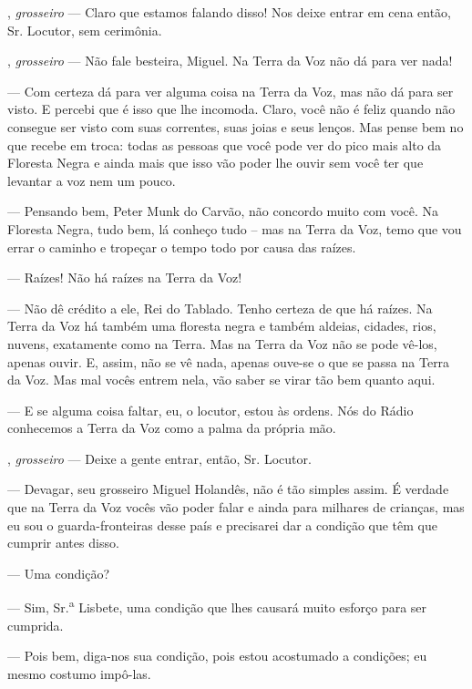 \begin{myparindent}{0pt}
\begin{Parskip}
, \emph{grosseiro} --- Claro que estamos falando disso!
Nos deixe entrar em cena então, Sr. Locutor, sem cerimônia.

, \emph{grosseiro} --- Não fale besteira, Miguel. Na Terra da Voz
não dá para ver nada!

 --- Com certeza dá para ver alguma coisa na Terra da
Voz, mas não dá para ser visto. E percebi que é isso que lhe incomoda.
Claro, você não é feliz quando não consegue ser visto com suas
correntes, suas joias e seus lenços. Mas pense bem no que recebe em
troca: todas as pessoas que você pode ver do pico mais alto da Floresta
Negra e ainda mais que isso vão poder lhe ouvir sem você ter que
levantar a voz nem um pouco.

 --- Pensando bem, Peter Munk do Carvão, não concordo muito
com você. Na Floresta Negra, tudo bem, lá conheço tudo -- mas na Terra
da Voz, temo que vou errar o caminho e tropeçar o tempo todo por causa
das raízes.

 --- Raízes! Não há raízes na Terra da Voz!

 --- Não dê crédito a ele, Rei do Tablado. Tenho
certeza de que há raízes. Na Terra da Voz há também uma floresta negra e
também aldeias, cidades, rios, nuvens, exatamente como na Terra. Mas na
Terra da Voz não se pode vê-los, apenas ouvir. E, assim, não se vê nada,
apenas ouve-se o que se passa na Terra da Voz. Mas mal vocês entrem
nela, vão saber se virar tão bem quanto aqui.

 --- E se alguma coisa faltar, eu, o locutor, estou às ordens. Nós
do Rádio conhecemos a Terra da Voz como a palma da própria mão.

, \emph{grosseiro} --- Deixe a gente entrar, então, Sr.
Locutor.

 --- Devagar, seu grosseiro Miguel Holandês, não é tão simples
assim. É verdade que na Terra da Voz vocês vão poder falar e ainda para
milhares de crianças, mas eu sou o guarda-fronteiras desse país e
precisarei dar a condição que têm que cumprir antes disso.

 --- Uma condição?

 --- Sim, Sr.\textsuperscript{a} Lisbete, uma condição que lhes
causará muito esforço para ser cumprida.

 --- Pois bem, diga-nos sua condição, pois estou acostumado
a condições; eu mesmo costumo impô-las.


\end{Parskip}
\end{myparindent}
